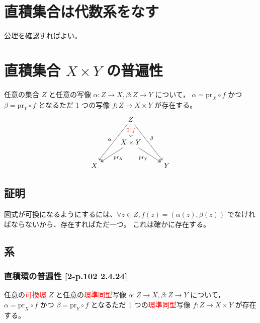 \documentclass[twocolumn]{jsarticle}
\newcommand{\pr}{\text{pr}}
\begin{document}
\section{直積集合は代数系をなす}
公理を確認すればよい。
\section{直積集合 \(X\times Y\) の普遍性}
\begin{screen}
任意の集合 \(Z\) と任意の写像 \(\alpha\colon Z \to X, \beta\colon Z \to Y\) について，
\(\alpha = \pr_X \circ f\) かつ \(\beta = \pr_Y \circ f\) となるただ 1 つの写像 \(f \colon Z \to X\times Y\) が存在する。
\[
\begin{tikzcd}
  & Z \arrow[d, "\textcolor{red}{\exists!\: f}" description, dotted] \arrow[ldd, "\alpha"'] \arrow[rdd, "\beta"] & \\
  & X\times Y \arrow[ld, "\pr_X", two heads] \arrow[rd, "\pr_Y"', two heads] & \\
X & & Y
\end{tikzcd}
\]
\end{screen}

\subsection{証明}
図式が可換になるようにするには、\(\forall z\in Z, f(z) = (\alpha(z), \beta(z))\) でなければならないから、存在すればただ一つ。
これは確かに存在する。

\subsection{系}
\subsubsection{直積環の普遍性 [2-p.102 2.4.24]}
任意の\textcolor{red}{可換環} \(Z\) と任意の\textcolor{red}{環準同型}写像 \(\alpha\colon Z \to X, \beta\colon Z \to Y\) について，
\(\alpha = \pr_X \circ f\) かつ \(\beta = \pr_Y \circ f\) となるただ 1 つの\textcolor{red}{環準同型}写像 \(f \colon Z \to X\times Y\) が存在する。
\end{document}
